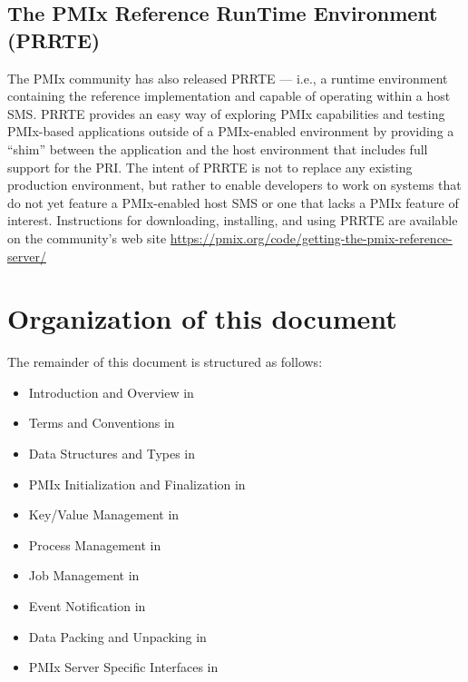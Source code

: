 \subsection{The PMIx Reference RunTime Environment (PRRTE)}

The \ac{PMIx} community has also released \ac{PRRTE} --- i.e., a runtime environment
containing the reference implementation and capable of operating within a host \ac{SMS}. \ac{PRRTE}
provides an easy way of exploring \ac{PMIx} capabilities and testing PMIx-based
applications outside of a PMIx-enabled environment by providing a ``shim'' between the application and the host environment that includes full support for the \ac{PRI}. The intent of \ac{PRRTE} is not to replace any existing production environment, but rather to enable developers to work on systems that do not yet feature a PMIx-enabled host \ac{SMS} or one that lacks a \ac{PMIx} feature of interest. Instructions for downloading,
installing, and using \ac{PRRTE} are available
on the community's web site \url{https://pmix.org/code/getting-the-pmix-reference-server/}

\section{Organization of this document}

The remainder of this document is structured as follows:

\begin{itemize}
\item Introduction and Overview in 
\item Terms and Conventions in 
\item Data Structures and Types in 
\item \ac{PMIx} Initialization and Finalization in 
\item Key/Value Management in 
\item Process Management in 
\item Job Management in 
\item Event Notification in 
\item Data Packing and Unpacking in 
\item \ac{PMIx} Server Specific Interfaces in 
\end{itemize}

